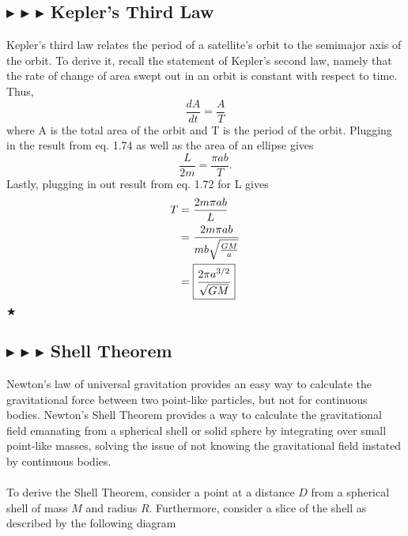 \subsection{\color{PineGreen} $\blacktriangleright$ \color{Goldenrod} $\blacktriangleright$ \color{Orchid} $\blacktriangleright$ \color{black} Kepler's Third Law} 
Kepler's third law relates the period of a satellite's orbit to the semimajor axis of the orbit. To derive it, recall the statement of Kepler's second law, namely that the rate of change of area swept out in an orbit is constant with respect to time. Thus, 
\begin{equation}
    \frac{dA}{dt} = \frac{A}{T}
\end{equation}
\noindent where A is the total area of the orbit and T is the period of the orbit. Plugging in the result from eq. 1.74 as well as the area of an ellipse gives
\begin{equation*}
    \frac{L}{2m} = \frac{\pi ab}{T}.
\end{equation*}
\noindent Lastly, plugging in out result from eq. 1.72 for L gives
\begin{align}
    T &= \frac{2m\pi ab}{L} \nonumber \\
    &= \frac{2m\pi ab}{mb\sqrt{\frac{GM}{a}}} \nonumber \\
    &= \boxed{\frac{2\pi a^{3/2}}{\sqrt{GM}}}
\end{align}
$\bigstar$

\subsection{\color{PineGreen} $\blacktriangleright$ \color{Goldenrod} $\blacktriangleright$ \color{Orchid} $\blacktriangleright$ \color{black} Shell Theorem}
Newton's law of universal gravitation provides an easy way to calculate the gravitational force between two point-like particles, but not for continuous bodies. Newton's Shell Theorem provides a way to calculate the gravitational field emanating from a spherical shell or solid sphere by integrating over small point-like masses, solving the issue of not knowing the gravitational field instated by continuous bodies. \\
\\
\noindent To derive the Shell Theorem, consider a point at a distance $D$ from a spherical shell of mass $M$ and radius $R$. Furthermore, consider a slice of the shell as described by the following diagram 

\newpage

